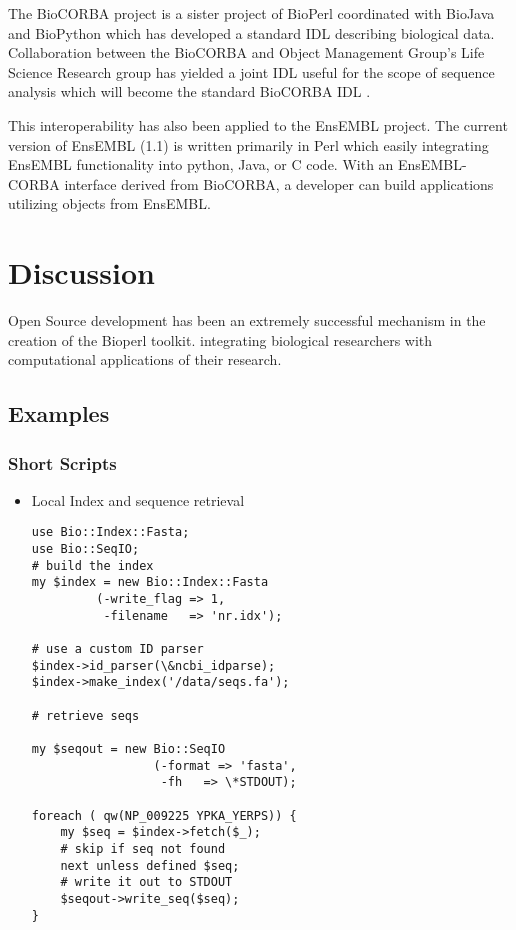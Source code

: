 \documentclass{article}
\begin{document}
\begin{twocolumn}
The BioCORBA project is a sister project of BioPerl coordinated with
BioJava and BioPython which has developed a standard IDL describing
biological data.  Collaboration between the BioCORBA and Object
Management Group's Life Science Research group has yielded a joint IDL
useful for the scope of sequence analysis which will become the
standard BioCORBA IDL \cite{biocorba}.

This interoperability has also been applied to the EnsEMBL project.
The current version of EnsEMBL (1.1) is written primarily in Perl
which easily integrating EnsEMBL functionality into python, Java, or C
code.  With an EnsEMBL-CORBA interface derived from BioCORBA, a
developer can build applications utilizing objects from EnsEMBL.

\section{Discussion}

Open Source development has been an extremely successful mechanism in
the creation of the Bioperl toolkit.  
integrating biological researchers with computational applications of
their research. 

\subsection{Examples}

\subsubsection{Short Scripts}
\begin{itemize}
\item Local Index and sequence retrieval

\begin{scriptsize}
\begin{verbatim}
use Bio::Index::Fasta;
use Bio::SeqIO;
# build the index
my $index = new Bio::Index::Fasta
         (-write_flag => 1,
          -filename   => 'nr.idx');

# use a custom ID parser
$index->id_parser(\&ncbi_idparse); 
$index->make_index('/data/seqs.fa');

# retrieve seqs

my $seqout = new Bio::SeqIO
                 (-format => 'fasta',
                  -fh   => \*STDOUT);

foreach ( qw(NP_009225 YPKA_YERPS)) {
    my $seq = $index->fetch($_);
    # skip if seq not found
    next unless defined $seq; 
    # write it out to STDOUT
    $seqout->write_seq($seq); 
}


\end{verbatim}
\end{scriptsize}
\end{itemize}
\end{twocolumn}
\end{document}
